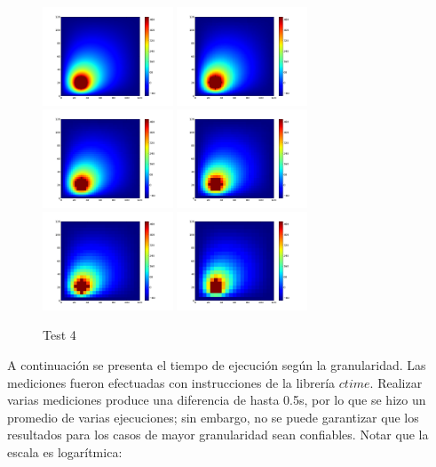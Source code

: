\documentclass[a4paper]{article}
\begin{document}
\begin{figure}[htbp]
\includegraphics[width=110pt]{img/Parabrisas4-1.png} \includegraphics[width=110pt]{img/Parabrisas4-2.png} \includegraphics[width=110pt]{img/Parabrisas4-3.png} \newline \includegraphics[width=110pt]{img/Parabrisas4-4.png} \includegraphics[width=110pt]{img/Parabrisas4-5.png} \includegraphics[width=110pt]{img/Parabrisas4-6.png} \newline
\caption{Test 4}
\end{figure}
\newpage
A continuación se presenta el tiempo de ejecución según la granularidad. Las mediciones fueron  efectuadas con instrucciones de la librería $ctime$. Realizar varias mediciones produce una diferencia de hasta 0.5s, por lo que se hizo un promedio de varias ejecuciones; sin embargo, no se puede garantizar que los resultados para los casos de mayor granularidad sean confiables. Notar que la escala es logarítmica:
\end{document}
